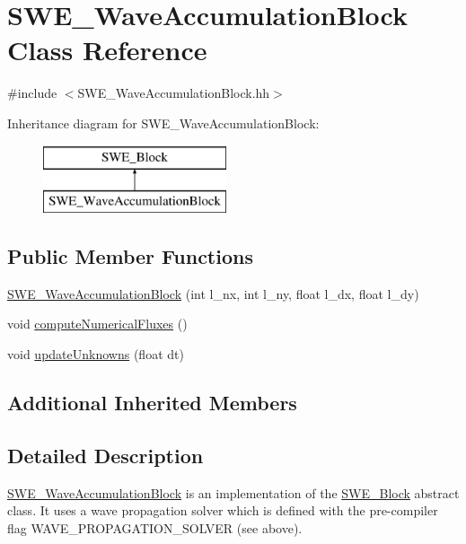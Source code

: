\hypertarget{classSWE__WaveAccumulationBlock}{\section{S\-W\-E\-\_\-\-Wave\-Accumulation\-Block Class Reference}
\label{classSWE__WaveAccumulationBlock}
}


{\ttfamily \#include $<$S\-W\-E\-\_\-\-Wave\-Accumulation\-Block.\-hh$>$}

Inheritance diagram for S\-W\-E\-\_\-\-Wave\-Accumulation\-Block\-:\begin{figure}[H]
\begin{center}
\leavevmode
\includegraphics[height=2.000000cm]{classSWE__WaveAccumulationBlock}
\end{center}
\end{figure}
\subsection*{Public Member Functions}
\begin{DoxyCompactItemize}
\item 
\hyperlink{classSWE__WaveAccumulationBlock_a20e04bf219dbf3d82c9f5eac1e7bd848}{S\-W\-E\-\_\-\-Wave\-Accumulation\-Block} (int l\-\_\-nx, int l\-\_\-ny, float l\-\_\-dx, float l\-\_\-dy)
\item 
void \hyperlink{classSWE__WaveAccumulationBlock_acac0b73f22b256bc91a58ff8d0831e5d}{compute\-Numerical\-Fluxes} ()
\item 
void \hyperlink{classSWE__WaveAccumulationBlock_a67b78723e81aec6e661b3710e6c41b43}{update\-Unknowns} (float dt)
\end{DoxyCompactItemize}
\subsection*{Additional Inherited Members}


\subsection{Detailed Description}
\hyperlink{classSWE__WaveAccumulationBlock}{S\-W\-E\-\_\-\-Wave\-Accumulation\-Block} is an implementation of the \hyperlink{classSWE__Block}{S\-W\-E\-\_\-\-Block} abstract class. It uses a wave propagation solver which is defined with the pre-\/compiler flag W\-A\-V\-E\-\_\-\-P\-R\-O\-P\-A\-G\-A\-T\-I\-O\-N\-\_\-\-S\-O\-L\-V\-E\-R (see above).

